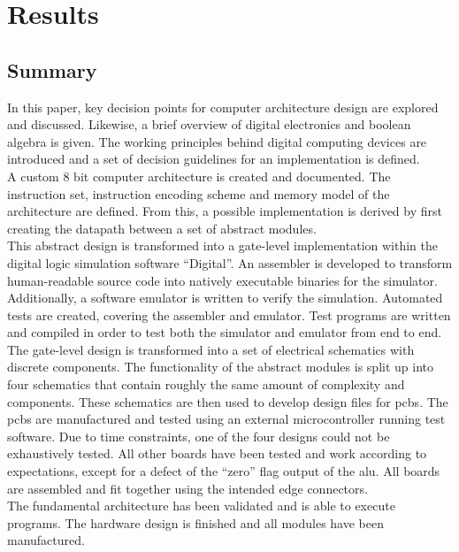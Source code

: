 \clearpage
\section{Results}

\subsection{Summary}

In this paper, key decision points for computer architecture design are explored and discussed. Likewise, a brief overview of digital electronics and boolean algebra is given. The working principles behind digital computing devices are introduced and a set of decision guidelines for an implementation is defined.
\\

A custom 8 bit computer architecture is created and documented. The instruction set, instruction encoding scheme and memory model of the architecture are defined. From this, a possible implementation is derived by first creating the datapath between a set of abstract modules.
\\

This abstract design is transformed into a gate-level implementation within the digital logic simulation software ``Digital''. An assembler is developed to transform human-readable source code into natively executable binaries for the simulator. Additionally, a software emulator is written to verify the simulation. Automated tests are created, covering the assembler and emulator. Test programs are written and compiled in order to test both the simulator and emulator from end to end.
\\

The gate-level design is transformed into a set of electrical schematics with discrete components. The functionality of the abstract modules is split up into four schematics that contain roughly the same amount of complexity and components. These schematics are then used to develop design files for \acp{pcb}. The \acp{pcb} are manufactured and tested using an external microcontroller running test software. Due to time constraints, one of the four designs could not be exhaustively tested. All other boards have been tested and work according to expectations, except for a defect of the ``zero'' flag output of the \ac{alu}. All boards are assembled and fit together using the intended edge connectors.
\\

The fundamental architecture has been validated and is able to execute programs. The hardware design is finished and all modules have been manufactured.

